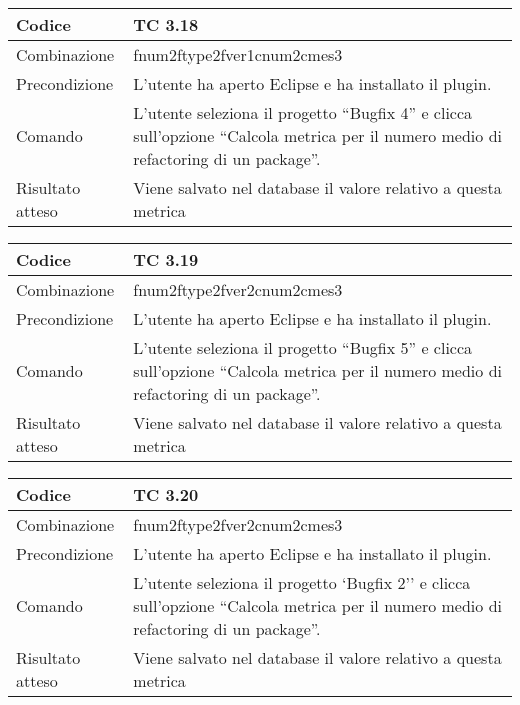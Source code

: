 \begin{table}[ht]
\begin{tabular}{|p{3cm}|p{9cm}|}
\hline
\cellcolor{lightgray}Codice				& TC 3.18								\\
\hline
\cellcolor{lightgray}Combinazione		& fnum2ftype2fver1cnum2cmes3  									\\
\hline
\cellcolor{lightgray}Precondizione		& L'utente ha aperto Eclipse e ha installato il plugin.				\\
\hline
\cellcolor{lightgray}Comando			& L'utente seleziona il progetto ``Bugfix 4''  e clicca sull'opzione ``Calcola metrica per il numero medio di refactoring di un package''.	\\
\hline
\cellcolor{lightgray}Risultato atteso	& Viene salvato nel database il valore relativo a questa metrica	\\
\hline
\end{tabular}
\end{table}

\begin{table}[ht]
\begin{tabular}{|p{3cm}|p{9cm}|}
\hline
\cellcolor{lightgray}Codice				& TC 3.19								\\
\hline
\cellcolor{lightgray}Combinazione		& fnum2ftype2fver2cnum2cmes3 									\\
\hline
\cellcolor{lightgray}Precondizione		& L'utente ha aperto Eclipse e ha installato il plugin.								\\
\hline
\cellcolor{lightgray}Comando			& L'utente seleziona il progetto ``Bugfix 5''  e clicca sull'opzione ``Calcola metrica per il numero medio di refactoring di un package''.	\\
\hline
\cellcolor{lightgray}Risultato atteso	& Viene salvato nel database il valore relativo a questa metrica	\\
\hline
\end{tabular}
\end{table}

\begin{table}[ht]
\begin{tabular}{|p{3cm}|p{9cm}|}
\hline
\cellcolor{lightgray}Codice				& TC 3.20								\\
\hline
\cellcolor{lightgray}Combinazione		& fnum2ftype2fver2cnum2cmes3 									\\
\hline
\cellcolor{lightgray}Precondizione		& L'utente ha aperto Eclipse e ha installato il plugin.									\\
\hline
\cellcolor{lightgray}Comando			& L'utente seleziona il progetto `Bugfix 2''  e clicca sull'opzione ``Calcola metrica per il numero medio di refactoring di un package''.	\\
\hline
\cellcolor{lightgray}Risultato atteso	& Viene salvato nel database il valore relativo a questa metrica	\\
\hline
\end{tabular}
\end{table}

